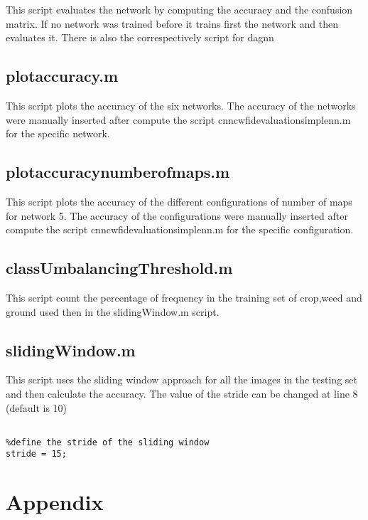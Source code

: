 \documentclass[]{report}
\begin{document}
This script evaluates the network by computing the accuracy and the confusion matrix. If no network was trained before it trains first the network and then evaluates it. There is also the correspectively script for dagnn

\section{plot\textunderscore accuracy.m}

This script plots the accuracy of the six networks. The accuracy of the networks were manually inserted after compute the script cnn\textunderscore cwfid\textunderscore evaluation\textunderscore simplenn.m for the specific network.

\section{plot\textunderscore accuracy\textunderscore number\textunderscore of\textunderscore maps.m}

This script plots the accuracy of the different configurations of number of maps for network 5. The accuracy of the configurations were manually inserted after compute the script cnn\textunderscore cwfid\textunderscore evaluation\textunderscore simplenn.m for the specific configuration.

\section{classUmbalancingThreshold.m}

This script count the percentage of frequency in the training set of crop,weed and ground used then in the slidingWindow.m script.

\section{slidingWindow.m}

This script uses the sliding window approach for all the images in the testing set and then calculate the accuracy.
The value of the stride can be changed at line 8 (default is 10)

\begin{lstlisting}

%define the stride of the sliding window
stride = 15;

\end{lstlisting}


\chapter{Appendix}
\end{document}
